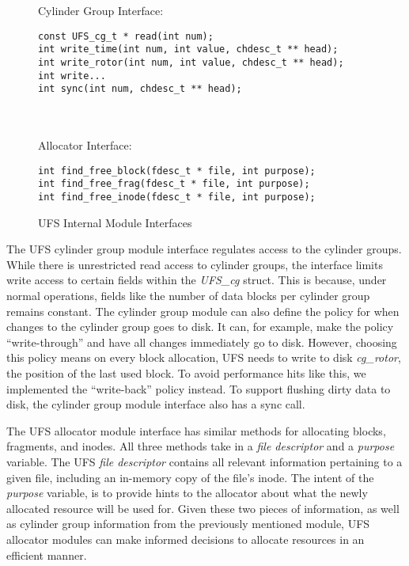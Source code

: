 \begin{figure}[htb]
Cylinder Group Interface:\\
\begin{scriptsize}
\texttt{const UFS\_cg\_t * read(int num);}\\
\texttt{int write\_time(int num, int value, chdesc\_t ** head);}\\
\texttt{int write\_rotor(int num, int value, chdesc\_t ** head);}\\
\texttt{int write...}\\
\texttt{int sync(int num, chdesc\_t ** head);}
\end{scriptsize}\\
\\
Allocator Interface:\\
\begin{scriptsize}
\texttt{int find\_free\_block(fdesc\_t * file, int purpose);}\\
\texttt{int find\_free\_frag(fdesc\_t * file, int purpose);}\\
\texttt{int find\_free\_inode(fdesc\_t * file, int purpose);}
\end{scriptsize}
\caption{\label{fig:moduleinterface} UFS Internal Module Interfaces}
\end{figure}

The UFS cylinder group module interface regulates access to the cylinder
groups. While there is unrestricted read access to cylinder groups, the
interface limits write access to certain fields within the \emph{UFS\_cg}
struct. This is because, under normal operations, fields like the number of
data blocks per cylinder group remains constant. The cylinder group module can
also define the policy for when changes to the cylinder group goes to disk.
It can, for example, make the policy ``write-through'' and have all changes
immediately go to disk. However, choosing this policy means on every block
allocation, UFS needs to write to disk \emph{cg\_rotor}, the position of the
last used block. To avoid performance hits like this, we implemented the
``write-back'' policy instead. To support flushing dirty data to disk, the
cylinder group module interface also has a sync call.

The UFS allocator module interface has similar methods for allocating blocks,
fragments, and inodes. All three methods take in a \emph{file descriptor} and
a \emph{purpose} variable. The UFS \emph{file descriptor} contains all relevant
information pertaining to a given file, including an in-memory copy of the
file's inode. The intent of the \emph{purpose} variable, is to provide hints to
the allocator about what the newly allocated resource will be used for. Given
these two pieces of information, as well as cylinder group information from the
previously mentioned module, UFS allocator modules can make informed decisions
to allocate resources in an efficient manner.

